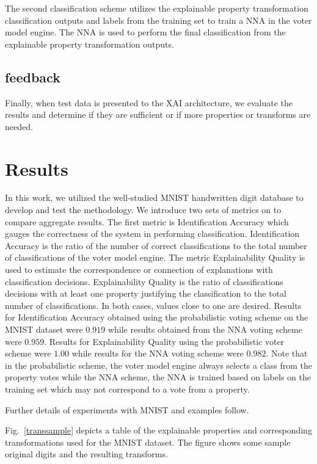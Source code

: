 \documentclass[conference]{IEEEtran}
\begin{document}
The second classification scheme utilizes the explainable property transformation classification outputs and labels from the training set to train a NNA in the voter model engine.  The NNA is used to perform the final classification from the explainable property transformation outputs. 

\subsection{feedback}
Finally, when test data is presented to the XAI architecture, we evaluate the results and determine if they are sufficient or if more properties or transforms are needed.

\section{Results}

In this work, we utilized the well-studied  MNIST handwritten digit database to develop and test the methodology.  We introduce two sets of metrics on to compare aggregate results.  The first metric is Identification Accuracy which gauges the correctness of the system in performing classification.  Identification Accuracy is the ratio of the number of correct classifications to the total number of classifications of the voter model engine.  The metric Explainability Quality is used to estimate the correspondence or connection of explanations with classification decisions.  Explainability Quality is the ratio of classifications decisions with at least one property justifying the classification to the total number of classifications.   In both cases, values close to one are desired.
Results for Identification Accuracy obtained using the probabilistic voting scheme on the MNIST dataset were $0.919$ while results obtained from the NNA voting scheme were $0.959$.  Results for Explainability Quality using the probabilistic voter scheme were $1.00$ while results for the NNA voting scheme were $0.982$.  Note that in the probabilistic scheme, the voter model engine always selects a class from the property votes while the NNA scheme, the NNA is trained based on labels on the training set which may not correspond to a vote from a property.

Further details of experiments with MNIST and examples follow.

Fig.~\ref{transsample} depicts a table of the explainable properties and corresponding transformations used for the MNIST dataset.  The figure shows some sample original digits and the resulting transforms.
\end{document}
